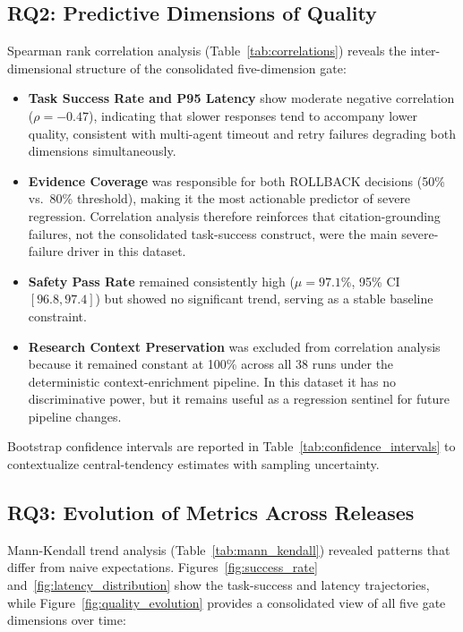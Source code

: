 

\subsection{RQ2: Predictive Dimensions of Quality}



Spearman rank correlation analysis (Table~\ref{tab:correlations}) reveals the inter-dimensional structure of the consolidated five-dimension gate:
\begin{itemize}
    \item \textbf{Task Success Rate and P95 Latency} show moderate negative correlation ($\rho = -0.47$), indicating that slower responses tend to accompany lower quality, consistent with multi-agent timeout and retry failures degrading both dimensions simultaneously.
    \item \textbf{Evidence Coverage} was responsible for both ROLLBACK decisions (50\% vs.\ 80\% threshold), making it the most actionable predictor of severe regression. Correlation analysis therefore reinforces that citation-grounding failures, not the consolidated task-success construct, were the main severe-failure driver in this dataset.
    \item \textbf{Safety Pass Rate} remained consistently high ($\mu = 97.1\%$, 95\% CI $[96.8, 97.4]$) but showed no significant trend, serving as a stable baseline constraint.
    \item \textbf{Research Context Preservation} was excluded from correlation analysis because it remained constant at 100\% across all 38 runs under the deterministic context-enrichment pipeline. In this dataset it has no discriminative power, but it remains useful as a regression sentinel for future pipeline changes.
\end{itemize}

Bootstrap confidence intervals are reported in Table~\ref{tab:confidence_intervals} to contextualize central-tendency estimates with sampling uncertainty.


\subsection{RQ3: Evolution of Metrics Across Releases}

Mann-Kendall trend analysis (Table~\ref{tab:mann_kendall}) revealed patterns that differ from naive expectations. Figures~\ref{fig:success_rate} and~\ref{fig:latency_distribution} show the task-success and latency trajectories, while Figure~\ref{fig:quality_evolution} provides a consolidated view of all five gate dimensions over time:

